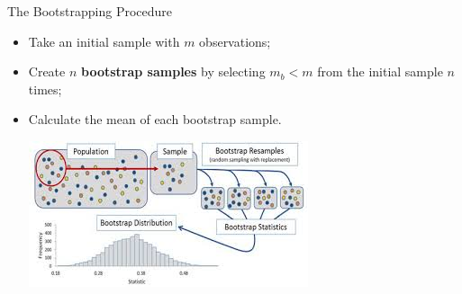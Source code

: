 \begin{frame}{The Bootstrapping Procedure}
  \begin{itemize}
    \item Take an initial sample with $m$ observations;
    \item Create $n$ {\bf bootstrap samples} by selecting $m_b < m$ from the initial sample $n$ times;
    \item Calculate the mean of each bootstrap sample.

    \begin{center}
      \includegraphics[width=.7\textwidth]{../img/bootstrap_lowres}
    \end{center}
  \end{itemize}
\end{frame}




